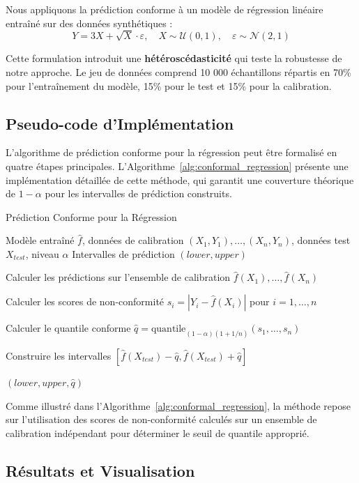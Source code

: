 \documentclass[a4paper,12pt]{article}
\begin{document}
Nous appliquons la prédiction conforme à un modèle de régression linéaire entraîné sur des données synthétiques :
$$Y = 3X + \sqrt{X} \cdot \varepsilon, \quad X \sim \mathcal{U}(0,1),\quad \varepsilon \sim \mathcal{N}(2,1)$$


Cette formulation introduit une \textbf{hétéroscédasticité} qui teste la robustesse de notre approche. Le jeu de données comprend 10 000 échantillons répartis en 70\% pour l'entraînement du modèle, 15\% pour le test et 15\% pour la calibration.
\subsection{Pseudo-code d'Implémentation}

L'algorithme de prédiction conforme pour la régression peut être formalisé en quatre étapes principales. L'Algorithme~\ref{alg:conformal_regression} présente une implémentation détaillée de cette méthode, qui garantit une couverture théorique de $1-\alpha$ pour les intervalles de prédiction construits.



\begin{algorithm}
\caption{Prédiction Conforme pour la Régression}
\label{alg:conformal_regression}
\begin{algorithmic}[1]
\REQUIRE Modèle entraîné $\hat{f}$, données de calibration $(X_1, Y_1), \ldots, (X_n, Y_n)$, données test $X_{test}$, niveau $\alpha$
\ENSURE Intervalles de prédiction $(lower, upper)$

\STATE Calculer les prédictions sur l'ensemble de calibration $\hat{f}(X_1), \ldots, \hat{f}(X_n)$

\STATE Calculer les scores de non-conformité $s_i = |Y_i - \hat{f}(X_i)|$ pour $i = 1, \ldots, n$

\STATE Calculer le quantile conforme $\hat{q} = \text{quantile}_{(1-\alpha)(1+1/n)}(s_1, \ldots, s_n)$

\STATE Construire les intervalles $[\hat{f}(X_{test}) - \hat{q}, \hat{f}(X_{test}) + \hat{q}]$

\RETURN $(lower, upper, \hat{q})$
\end{algorithmic}
\end{algorithm}

Comme illustré dans l'Algorithme~\ref{alg:conformal_regression}, la méthode repose sur l'utilisation des scores de non-conformité calculés sur un ensemble de calibration indépendant pour déterminer le seuil de quantile approprié.


\subsection{Résultats et Visualisation}
\end{document}
